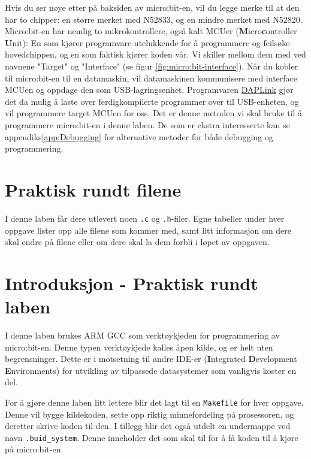 \begin{alphasection}
Hvis du ser nøye etter på baksiden av micro:bit-en, vil du legge merke til at den har to chipper: en større merket med N52833, og en mindre merket med N52820. Micro:bit-en har nemlig to mikrokontrollere, også kalt {MCU}er (\textbf{M}icro\textbf{c}ontroller \textbf{U}nit): En som kjører programvare utelukkende for å programmere og feilsøke hovedchippen, og en som faktisk kjører koden vår. Vi skiller mellom dem med ved navnene "Target" og "Interface" (se figur \ref{fig:micro:bit-interface}). Når du kobler til micro:bit-en til en datamaskin, vil datamaskinen kommunisere med interface MCUen og oppdage den som USB-lagringsenhet. Programvaren \href{https://tech.microbit.org/software/daplink-interface/}{DAPLink} gjør det da mulig å laste over ferdigkompilerte programmer over til USB-enheten, og vil programmere target MCUen for oss. Det er denne metoden vi skal bruke til å programmere micro:bit-en i denne laben. De som er ekstra interesserte kan se appendiks\ref{app:Debugging} for alternative metoder for både debugging og programmering. 

\section{Praktisk rundt filene}

I denne laben får dere utlevert noen \verb|.c| og \verb|.h|-filer. Egne tabeller under hver oppgave lister opp alle filene som kommer med, samt litt informasjon om dere skal endre på filene eller om dere skal la dem forbli i løpet av oppgaven.


\section{Introduksjon - Praktisk rundt laben}


I denne laben brukes ARM GCC som verktøykjeden for programmering av micro:bit-en. Denne typen verktøykjede kalles åpen kilde, og er helt uten begrensninger. Dette er i motsetning til andre IDE-er (\textbf{I}ntegrated \textbf{D}evelopment \textbf{E}nvironments) for utvikling av tilpassede datasystemer som vanligvis koster en del. 

For å gjøre denne laben litt lettere blir det lagt til en \verb|Makefile| for hver oppgave. Denne vil bygge kildekoden, sette opp riktig minnefordeling på prosessoren, og deretter skrive koden til den. I tillegg blir det også utdelt en undermappe ved navn \verb|.buid_system|. Denne inneholder det som skal til for å få koden til å kjøre på micro:bit-en. 


\end{alphasection}
